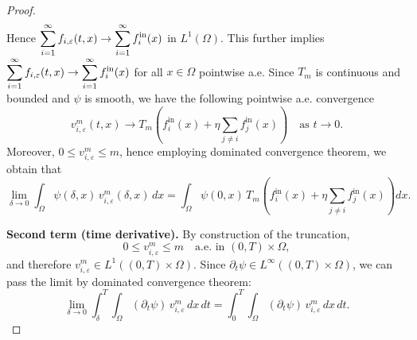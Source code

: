 \documentclass[a4paper,12pt,reqno]{amsart}
\theoremstyle{plain}
\numberwithin{equation}{section}
\begin{document}
\begin{proof}
\begin{align*}
		\end{align*}
		Hence $\displaystyle{\sum_{i=1}^{\infty} f_{i,\varepsilon}(t,x)\to \sum_{i=1}^{\infty} f_{i}^{\rm{in}}(x) }$ in $L^1(\Omega)$. This further implies $\displaystyle{\sum_{i=1}^{\infty} f_{i,\varepsilon}(t,x)\to \sum_{i=1}^{\infty} f_{i}^{\rm{in}}(x) }$ for all $x\in \Omega$ pointwise a.e.
		\newline
		Since $T_m$ is continuous and bounded and $\psi$ is smooth, we have
		the following pointwise a.e. convergence
		\[
		v^m_{i,\varepsilon}(t,x)
		\longrightarrow
		T_m\!\left(
		f_i^{\mathrm{in}}(x)
		+ \eta \sum_{j\ne i} f_j^{\mathrm{in}}(x)
		\right)
		\quad \text{as } t\to0 .
		\]
		Moreover,
		\(
		0 \le v^m_{i,\varepsilon} \le m
		\),
		hence employing dominated convergence theorem, we obtain that
		\[
		\lim_{\delta\to0}
		\int_{\Omega} \psi(\delta,x)\, v^m_{i,\varepsilon}(\delta,x)\,dx
		=
		\int_{\Omega}
		\psi(0,x)\,
		T_m\!\left(
		f_i^{\mathrm{in}}(x)
		+ \eta \sum_{j\ne i} f_j^{\mathrm{in}}(x)
		\right) dx .
		\]
		
		\medskip
		\noindent\textbf{Second term (time derivative).}
		By construction of the truncation,
		\[
		0 \le v^m_{i,\varepsilon} \le m
		\quad \text{a.e. in } (0,T)\times\Omega,
		\]
		and therefore
		\(
		v^m_{i,\varepsilon} \in L^1((0,T)\times\Omega).
		\)
		Since $\partial_t\psi \in L^\infty((0,T)\times\Omega)$, we can pass the
		limit by dominated convergence theorem:
		\[
		\lim_{\delta\to0}
		\int_{\delta}^{T}\!\!\int_{\Omega}
		(\partial_t\psi)\, v^m_{i,\varepsilon}\,dx\,dt
		=
		\int_{0}^{T}\!\!\int_{\Omega}
		(\partial_t\psi)\, v^m_{i,\varepsilon}\,dx\,dt .
		\]
		

\end{proof}
\end{document}
